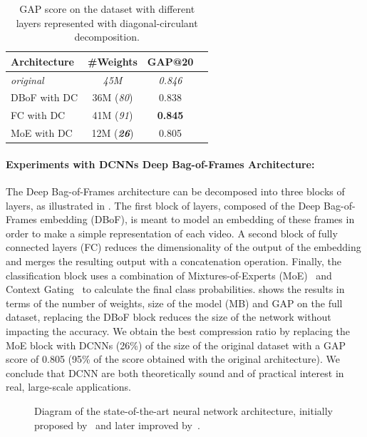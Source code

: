 \begin{table}
  \centering
  \begin{tabular}{lccc}
  \toprule
  \textbf{Architecture} & \textbf{\#Weights} & \textbf{GAP@20} \\
  \midrule
  \textit{original} & \textit{45M} & \textit{0.846} \\
  DBoF with DC   & 36M (\textit{80}) & 0.838 \\
  FC with DC    & 41M (\textit{91}) & \textbf{0.845} \\
  MoE with DC   & 12M (\textit{\textbf{26}}) & 0.805 \\
  \bottomrule
  \end{tabular}
  \caption{GAP score on the \yt dataset with different layers represented with diagonal-circulant decomposition.}
  \label{table:youtube_full_xp}
\end{table}

\paragraph{Experiments with DCNNs Deep Bag-of-Frames Architecture:}
The Deep Bag-of-Frames architecture can be decomposed into three blocks of layers, as illustrated in .
The first block of layers, composed of the Deep Bag-of-Frames embedding (DBoF), is meant to model an embedding of these frames in order to make a simple representation of each video.
A second block of fully connected layers (FC) reduces the dimensionality of the output of the embedding and merges the resulting output with a concatenation operation.
Finally, the classification block uses a combination of Mixtures-of-Experts (MoE)~\cite{jordan1993hierarchical,abu2016youtube} and Context Gating~\cite{miech2017learnable} to calculate the final class probabilities.
 shows the results in terms of the number of weights, size of the model (MB) and GAP on the full dataset, replacing the DBoF block reduces the size of the network without impacting the accuracy.
We obtain the best compression ratio by replacing the MoE block with DCNNs (26\%) of the size of the original dataset with a GAP score of 0.805 (95\% of the score obtained with the original architecture).
We conclude that DCNN are both theoretically sound and of practical interest in real, large-scale applications.

\begin{figure}[htb]
  \centering
  
  \caption{Diagram of the state-of-the-art neural network architecture, initially proposed by~\citet{abu2016youtube} and later improved by~\citet{miech2017learnable}.}
  \label{figure:ch4-archi_youtube}
\end{figure}

